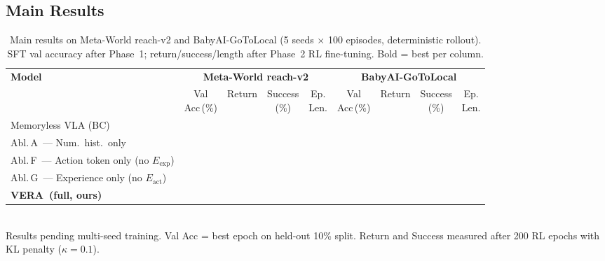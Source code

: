 \documentclass{article}
\newcommand{\modelname}{\textsc{VERA}\xspace}
\newcommand{\Lact}{$E_{\mathrm{act}}$\xspace}   %
\newcommand{\Lexp}{$E_{\mathrm{exp}}$\xspace}   %
\begin{document}
\subsection{Main Results}

\begin{table}[h]
\centering
\caption{Main results on Meta-World reach-v2 and BabyAI-GoToLocal (5 seeds $\times$ 100 episodes,
         deterministic rollout). SFT val accuracy after Phase~1; return/success/length after
         Phase~2 RL fine-tuning. Bold = best per column.}
\label{tab:results}
\small
\setlength{\tabcolsep}{5pt}
\begin{tabular}{lcccccccc}
\toprule
\multirow{2}{*}{\textbf{Model}}
  & \multicolumn{4}{c}{\textbf{Meta-World reach-v2}}
  & \multicolumn{4}{c}{\textbf{BabyAI-GoToLocal}} \\
  \cmidrule(lr){2-5}\cmidrule(lr){6-9}
  & \makecell{Val\\Acc\,(\%)} & Return & \makecell{Success\\(\%)} & \makecell{Ep.\\Len.}
  & \makecell{Val\\Acc\,(\%)} & Return & \makecell{Success\\(\%)} & \makecell{Ep.\\Len.} \\
\midrule
Memoryless VLA (BC)
  & \text{---} & \text{---} & \text{---} & \text{---}
  & \text{---} & \text{---} & \text{---} & \text{---} \\
Abl.\,A\ — Num.\ hist.\ only
  & \text{---} & \text{---} & \text{---} & \text{---}
  & \text{---} & \text{---} & \text{---} & \text{---} \\
Abl.\,F\ — Action token only (no \Lexp)
  & \text{---} & \text{---} & \text{---} & \text{---}
  & \text{---} & \text{---} & \text{---} & \text{---} \\
Abl.\,G\ — Experience only (no \Lact)
  & \text{---} & \text{---} & \text{---} & \text{---}
  & \text{---} & \text{---} & \text{---} & \text{---} \\
\textbf{\modelname\ (full, ours)}
  & \textbf{\text{---}} & \textbf{\text{---}} & \textbf{\text{---}} & \textbf{\text{---}}
  & \textbf{\text{---}} & \textbf{\text{---}} & \textbf{\text{---}} & \textbf{\text{---}} \\
\bottomrule
\end{tabular}
\vspace{2pt}\\
\footnotesize
Results pending multi-seed training. Val Acc = best epoch on held-out 10\% split.
Return and Success measured after 200 RL epochs with KL penalty ($\kappa{=}0.1$).
\end{table}
\end{document}
